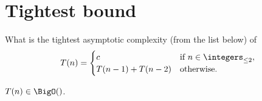 \documentclass[
  coursecode={CISC/CMPE 365},
  assignmentname={Lab 1},
  studentnumber=20053722,
  name={Bryan Hoang}
]{
  ltxanswer%
}
\begin{document}
  \section*{Tightest bound}
  \begin{questions}
    \question{}
    What is the tightest asymptotic complexity (from the list below) of
    \begin{equation*}
      T(n) = \begin{cases}
        c                   & \text{if}\ n \in \integers_{\le 2}, \\
        T(n - 1) + T(n - 2) & \text{otherwise}.
      \end{cases}
    \end{equation*}
    \begin{solution}
      \(T(n) \in \BigO()\).
    \end{solution}
  \end{questions}
\end{document}

